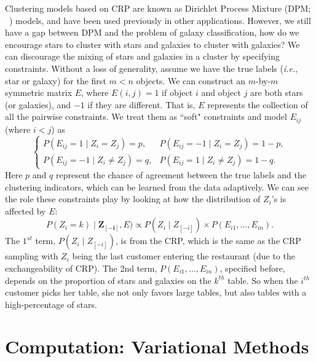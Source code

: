 Clustering models based on CRP are known as Dirichlet Process Mixture (DPM; ~\citealt{antoniak74}) models, and have been used previously in other applications. However, we still have a gap between DPM and the problem of galaxy classification, how do we encourage stars to cluster with stars and galaxies to cluster with galaxies? We can discourage the mixing of stars and galaxies in a cluster by specifying  constraints. Without a loss of generality, assume we have the true labels (\textit{i.e.}, star or galaxy) for the first $m<n$ objects. We can construct an $m$-by-$m$ symmetric matrix $E$, where $E(i,j) = 1$ if object $i$ and object $j$ are both stars (or galaxies), and $-1$ if they are different. That is,  $E$ represents the collection of all the pairwise constraints. We treat them as ``soft" constraints and model $E_{ij}$ (where $i<j$) as
\[
\left \{ \begin{array}{ll} P(E_{ij} = 1 \mid Z_i = Z_j) = p, & P(E_{ij} = -1 \mid Z_i = Z_j) = 1- p, \\
P(E_{ij} = -1 \mid Z_i  \ne Z_j) = q, & P(E_{ij} = 1 \mid Z_i \ne  Z_j) = 1-q.
\end{array} \right.
\]
Here $p$ and $q$ represent the chance of agreement between the true labels and the clustering indicators, which can be learned from the data adaptively. We can see the role these constraints play by looking at how the distribution of $Z_i$'s is affected by $E$:
$$
P(Z_i = k) \mid \mathbf{Z_{[-i]}}, E)  \propto  P(Z_i \mid Z_{[-i]}) 
  \times P(E_{i1}, \dots, E_{in}).
$$
The $1^{st}$ term, $P(Z_i \mid Z_{[-i]})$, is from the CRP, which is the same as the CRP sampling with $Z_i$ being the last customer entering the restaurant (due to the  exchangeability of CRP). The 2nd term, $P(E_{i1}, \dots, E_{in})$, specified before, depends on the proportion of stars and galaxies on the $k^{th}$ table. So when the $i^{th}$ customer picks her table, she not only favors large tables, but also tables with a high-percentage of stars. 
 
\section{Computation: Variational Methods}


